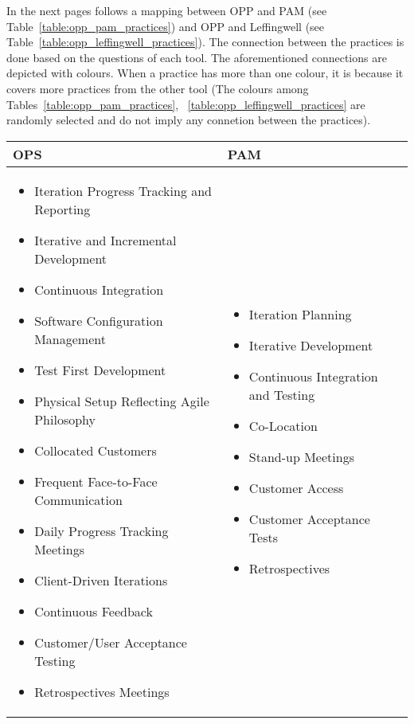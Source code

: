 In the next pages follows a mapping between OPP and PAM (see Table~\ref{table:opp_pam_practices}) and OPP and Leffingwell (see Table~\ref{table:opp_leffingwell_practices}). The connection between the practices is done based on the questions of each tool. The aforementioned connections are depicted with colours. When a practice has more than one colour, it is because it covers more practices from the other tool {\footnotesize (The colours among  Tables~\ref{table:opp_pam_practices}, ~\ref{table:opp_leffingwell_practices} are randomly selected and do not imply any connetion between the practices)}.



\begin{tabular}{| p{7.5cm} | p{7cm} |}
	\hline
	\textbf{OPS} & \textbf{PAM}  \\ \hline
     	\begin{itemize}
     		\item {\color{RoyalBlue1}Iteration Progress Tracking and Reporting}
     		\item {\color{RoyalBlue1}Iterative} {\color{DarkMagenta}and Incremental Development} 
     		\item {\color{DarkOrange1}Continuous Integration} 
     		\item {\color{DarkOrange1}Software Configuration Management} 
     		\item {\color{DarkOrange1}Test First Development} 
     		\item {\color{DeepPink1}Physical Setup Reflecting Agile Philosophy} 
     		\item {\color{DarkBlue}Collocated} {\color{DeepPink1}Customers}
     		\item {\color{DarkBlue}Frequent Face-to-Face} {\color{DeepPink1}Communication} 
     		\item {\color{green4}Daily Progress Tracking Meetings} 
     		\item {\color{DarkBlue}Client-Driven} {\color{RoyalBlue1}Iterations}
     		\item {\color{DarkBlue}Continuous Feedback} 
     		\item {\color{red2}Customer/User Acceptance Testing}
     		\item {\color{DarkRed}Retrospectives Meetings}
 		\end{itemize} 
 		& \begin{itemize}
 			\item {\color{RoyalBlue1}Iteration Planning} 
 			\item {\color{DarkMagenta}Iterative Development} 
 			\item {\color{DarkOrange1}Continuous Integration and Testing} 
 			\item {\color{DeepPink1}Co-Location} 
 			\item {\color{green4}Stand-up Meetings} 
 			\item {\color{DarkBlue}Customer Access} 
 			\item {\color{red2}Customer Acceptance Tests} 
 			\item {\color{DarkRed}Retrospectives} 
 		\end{itemize}
     \\ \hline
\end{tabular}
